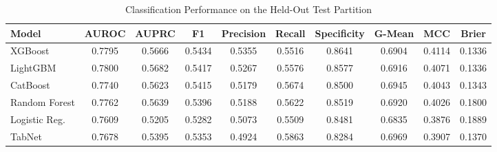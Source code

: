 \begin{table}
\centering
\caption{Classification Performance on the Held-Out Test Partition}
\label{tab:results}
\begin{tabular}{lccccccccc}
\toprule
Model & AUROC & AUPRC & F1 & Precision & Recall & Specificity & G-Mean & MCC & Brier \\
\midrule
XGBoost & 0.7795 & 0.5666 & 0.5434 & 0.5355 & 0.5516 & 0.8641 & 0.6904 & 0.4114 & 0.1336 \\
LightGBM & 0.7800 & 0.5682 & 0.5417 & 0.5267 & 0.5576 & 0.8577 & 0.6916 & 0.4071 & 0.1336 \\
CatBoost & 0.7740 & 0.5623 & 0.5415 & 0.5179 & 0.5674 & 0.8500 & 0.6945 & 0.4043 & 0.1343 \\
Random Forest & 0.7762 & 0.5639 & 0.5396 & 0.5188 & 0.5622 & 0.8519 & 0.6920 & 0.4026 & 0.1800 \\
Logistic Reg. & 0.7609 & 0.5205 & 0.5282 & 0.5073 & 0.5509 & 0.8481 & 0.6835 & 0.3876 & 0.1889 \\
TabNet & 0.7678 & 0.5395 & 0.5353 & 0.4924 & 0.5863 & 0.8284 & 0.6969 & 0.3907 & 0.1370 \\
\bottomrule
\end{tabular}
\end{table}
